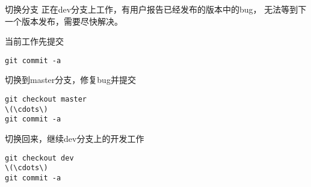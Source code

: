 %   
%   
%   

\begin{frame}[<+->][fragile]{切换分支}
\onslide<+->
正在dev分支上工作，有用户报告已经发布的版本中的bug，
无法等到下一个版本发布，需要尽快解决。

\onslide<+->
当前工作先提交
\begin{Verbatim}[frame=single,commandchars=\\\{\}]
git commit -a
\end{Verbatim}

\onslide<+->
切换到master分支，修复bug并提交
\begin{Verbatim}[frame=single,commandchars=\\\{\}]
git checkout master
\(\cdots\)
git commit -a
\end{Verbatim}

\onslide<+->
切换回来，继续dev分支上的开发工作
\begin{Verbatim}[frame=single,commandchars=\\\{\}]
git checkout dev
\(\cdots\)
git commit -a
\end{Verbatim}
\end{frame}

